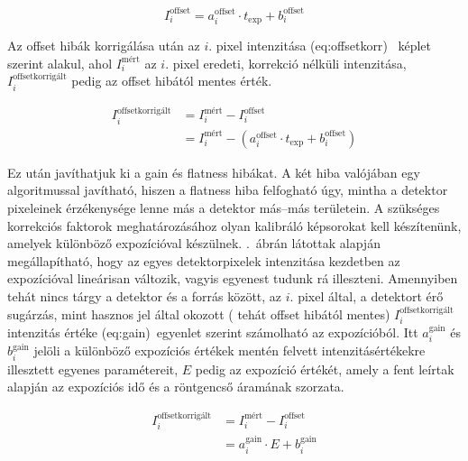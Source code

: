 \documentclass[a4paper,12pt]{article}
\begin{document}
\begin{equation}
\label{eq:offset}
I_i^{\text{offset}} =  a_i^{\text{offset}} \cdot t_{\text{exp}} + b_i^{\text{offset}}
\end{equation}

Az offset hibák korrigálása után  az $i$. pixel intenzitása \aref({eq:offsetkorr})~ képlet szerint alakul, ahol $I_i^{\text{mért}}$ az $i.$ pixel eredeti, korrekció nélküli intenzitása, $I_i^{\text{offsetkorrigált}}$ pedig az offset hibától mentes érték.

\begin{equation}
\label{eq:offsetkorr}
\begin{split}
I_i^{\text{offsetkorrigált}}  &=  I_i^{\text{mért}} - I_i^{\text{offset}} \\&=  I_i^{\text{mért}} - \left( a_i^{\text{offset}} \cdot t_{\text{exp}} + b_i^{\text{offset}} \right)
\end{split}
\end{equation}


Ez után javíthatjuk ki a gain és flatness hibákat. A két hiba valójában egy algoritmussal javítható, hiszen a flatness hiba felfogható úgy, mintha a detektor pixeleinek érzékenysége lenne más a detektor más--más területein. A szükséges korrekciós faktorok meghatározásához olyan kalibráló képsorokat kell készítenünk, amelyek különböző expozícióval készülnek. .~ábrán látottak alapján megállapítható, hogy az egyes detektorpixelek intenzitása kezdetben az expozícióval lineárisan változik, vagyis egyenest tudunk rá illeszteni. Amennyiben tehát nincs tárgy a detektor és a forrás között, az $i$. pixel által, a detektort érő sugárzás, mint hasznos jel által okozott ( tehát offset hibától mentes) $ I_i^{\text{offsetkorrigált}}$  intenzitás értéke \aref({eq:gain})~egyenlet szerint számolható az expozícióból. Itt $a_i^{\text{gain}}  $ és $b_i^{\text{gain}}$ jelöli a különböző expozíciós értékek mentén felvett intenzitásértékekre illesztett egyenes paramétereit, $E$ pedig az expozíció értékét, amely a fent leírtak alapján az expozíciós idő és a röntgencső áramának szorzata.

\begin{equation}
\label{eq:gain}
\begin{split}
I_i^{\text{offsetkorrigált}}  &=  I_i^{\text{mért}} - I_i^{\text{offset}} \\&=  a_i^{\text{gain}} \cdot E + b_i^{\text{gain}}
\end{split}
\end{equation}
\end{document}
